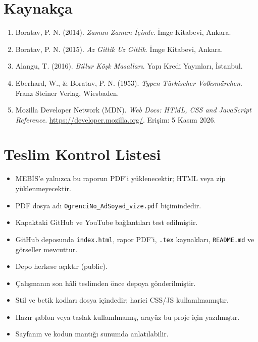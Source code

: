 \documentclass[11pt,a4paper]{article}
\begin{document}
\section{Kaynakça}
\begin{enumerate}
    \item Boratav, P. N. (2014). \textit{Zaman Zaman İçinde}. İmge Kitabevi, Ankara.
    \item Boratav, P. N. (2015). \textit{Az Gittik Uz Gittik}. İmge Kitabevi, Ankara.
    \item Alangu, T. (2016). \textit{Billur Köşk Masalları}. Yapı Kredi Yayınları, İstanbul.
    \item Eberhard, W., \& Boratav, P. N. (1953). \textit{Typen Türkischer Volksmärchen}. Franz Steiner Verlag, Wiesbaden.
    \item Mozilla Developer Network (MDN). \textit{Web Docs: HTML, CSS and JavaScript Reference}. \url{https://developer.mozilla.org/}. Erişim: 5 Kasım 2026.
\end{enumerate}

\appendix
\newpage
\section{Teslim Kontrol Listesi}
\begin{itemize}
    \item[$\boxtimes$] MEBİS'e yalnızca bu raporun PDF'i yüklenecektir; HTML veya zip yüklenmeyecektir.
    \item[$\boxtimes$] PDF dosya adı \texttt{OgrenciNo\_AdSoyad\_vize.pdf} biçimindedir.
    \item[$\boxtimes$] Kapaktaki GitHub ve YouTube bağlantıları test edilmiştir.
    \item[$\boxtimes$] GitHub deposunda \texttt{index.html}, rapor PDF'i, \texttt{.tex} kaynakları, \texttt{README.md} ve görseller mevcuttur.
    \item[$\boxtimes$] Depo herkese açıktır (public).
    \item[$\boxtimes$] Çalışmanın son hâli teslimden önce depoya gönderilmiştir.
    \item[$\boxtimes$] Stil ve betik kodları dosya içindedir; harici CSS/JS kullanılmamıştır.
    \item[$\boxtimes$] Hazır şablon veya taslak kullanılmamış, arayüz bu proje için yazılmıştır.
    \item[$\boxtimes$] Sayfanın ve kodun mantığı sunumda anlatılabilir.
\end{itemize}
\end{document}

